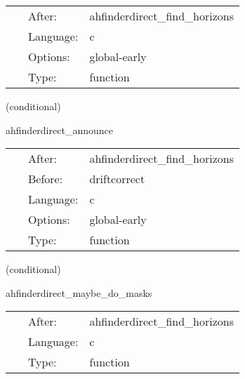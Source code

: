 \hspace{5mm}{\it save apparent horizon(s) into cactus variables } 


\hspace{5mm}

 \begin{tabular*}{160mm}{cll} 
~ & After:  & ahfinderdirect\_find\_horizons \\ 
~ & Language:  & c \\ 
~ & Options:  & global-early \\ 
~ & Type:  & function \\ 
\end{tabular*} 


\vspace{5mm}

   (conditional) 

\hspace{5mm} ahfinderdirect\_announce 

\hspace{5mm}{\it announce horizon position(s) to other thorns } 


\hspace{5mm}

 \begin{tabular*}{160mm}{cll} 
~ & After:  & ahfinderdirect\_find\_horizons \\ 
~ & Before:  & driftcorrect \\ 
~ & Language:  & c \\ 
~ & Options:  & global-early \\ 
~ & Type:  & function \\ 
\end{tabular*} 


\vspace{5mm}

   (conditional) 

\hspace{5mm} ahfinderdirect\_maybe\_do\_masks 

\hspace{5mm}{\it set mask(s) based on apparent horizon position(s) } 


\hspace{5mm}

 \begin{tabular*}{160mm}{cll} 
~ & After:  & ahfinderdirect\_find\_horizons \\ 
~ & Language:  & c \\ 
~ & Type:  & function \\ 
\end{tabular*} 


